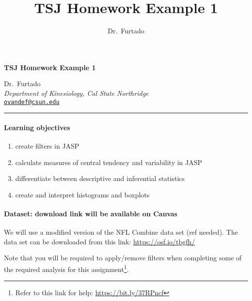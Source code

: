 \documentclass[11pt,]{article}
\title{TSJ \textbar{} Homework Example 1}
\author{Dr.~Furtado}
\date{}
\newcommand{\blankline}{\quad\pagebreak[2]}
\providecommand{\tightlist}{%
  \setlength{\itemsep}{0pt}\setlength{\parskip}{0pt}}
\begin{document}
  



\thispagestyle{plain} 

\begin{flushleft}\Large \bf TSJ \textbar{} Homework Example
1  \end{flushleft}
	\vspace{1 mm}   
Dr.~Furtado \\
\emph{Department of Kinesiology, Cal State Northridge} \\
\texttt{\href{mailto:ovandef@csun.edu}{\nolinkurl{ovandef@csun.edu}}}   \\

  

\hrule

\vspace{6 mm}
	


\hypertarget{learning-objectives}{%
\paragraph{Learning objectives}\label{learning-objectives}}

\begin{enumerate}
\def\labelenumi{\arabic{enumi}.}
\tightlist
\item
  create filters in JASP
\item
  calculate measures of central tendency and variability in JASP
\item
  differentiate between descriptive and inferential statistics
\item
  create and interpret histograms and boxplots
\end{enumerate}

\hypertarget{dataset-download-link-will-be-available-on-canvas}{%
\paragraph{Dataset: download link will be available on
Canvas}\label{dataset-download-link-will-be-available-on-canvas}}

We will use a modified version of the NFL Combine data set (ref needed).
The data set can be downloaded from this link:
\url{https://osf.io/tbgfh/}

Note that you will be required to apply/remove filters when completing
some of the required analysis for this assignment\footnote{Refer to this
  link for help: \url{https://bit.ly/37RPncf}}.
\end{document}
